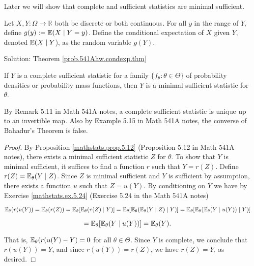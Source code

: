 \begin{remark}Later we will show that complete and sufficient statistics are minimal sufficient. 
\end{remark}

\begin{exercise}\label{mathstats.ex.5.24} Let \(X, Y: \Omega \to \mathbb{R}\) both be discrete or both continuous. For all \(y\) in the range of \(Y\), define \(g(y) := \E(X \mid Y=y)\). Define the conditional expectation of \(X\) given \(Y\), denoted \(\E(X \mid Y\)), as the random variable \(g(Y)\). 

\end{exercise}

Solution: Theorem \ref{prob.541Ahw.condexp.thm}

\begin{theorem} If \(Y\) is a complete sufficient statistic for a family \(\{f_\theta: \theta \in \Theta\}\) of probability densities or probability mass functions, then \(Y\) is a minimal sufficient statistic for \(\theta\).

\end{theorem}

\begin{remark}By Remark 5.11 in Math 541A notes, a complete sufficient statistic is unique up to an invertible map. Also by Example 5.15 in Math 541A notes, the converse of Bahadur's Theorem is false.

\end{remark}

\begin{proof} By Proposition \ref{mathstats.prop.5.12} (Proposition 5.12 in Math 541A notes), there exists a minimal sufficient statistic \(Z\) for \(\theta\). To show that \(Y\) is minimal sufficient, it suffices to find a function \(r\) such that \(Y = r(Z)\). Define \(r(Z) = \E_\theta(Y \mid Z)\). Since \(Z\) is minimal sufficient and \(Y\) is sufficient by assumption, there exists a function \(u\) such that \(Z = u(Y)\). By conditioning on \(Y\) we have by Exercise \ref{mathstats.ex.5.24} (Exercise 5.24 in the Math 541A notes)

\[
\E_\theta(r(u(Y)) = \E_\theta(r(Z)) = \E_\theta [\E_\theta(r(Z) \mid Y)]  = \E_\theta [\E_\theta( \E_\theta(Y \mid Z) \mid Y)] = \E_\theta [\E_\theta( \E_\theta(Y \mid u(Y)) \mid Y)]
\]

\[
= \E_\theta [\E_\theta(Y \mid u(Y))] = \E_\theta(Y).
\]

That is, \(\E_\theta(r(u(Y) - Y) = 0\) for all \(\theta \in \Theta\). Since \(Y\) is complete, we conclude that \(r(u(Y)) = Y\), and since \(r(u(Y)) = r(Z)\), we have \(r(Z) = Y\), as desired. 

\end{proof}

